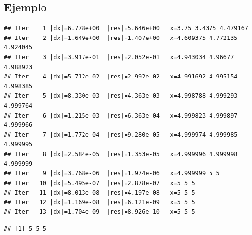 \documentclass[
]{book}
\newenvironment{Shaded}{\begin{snugshade}}{\end{snugshade}}
\newcommand{\AttributeTok}[1]{\textcolor[rgb]{0.13,0.29,0.53}{#1}}
\newcommand{\ConstantTok}[1]{\textcolor[rgb]{0.56,0.35,0.01}{#1}}
\newcommand{\DecValTok}[1]{\textcolor[rgb]{0.00,0.00,0.81}{#1}}
\newcommand{\FloatTok}[1]{\textcolor[rgb]{0.00,0.00,0.81}{#1}}
\newcommand{\FunctionTok}[1]{\textcolor[rgb]{0.13,0.29,0.53}{\textbf{#1}}}
\newcommand{\NormalTok}[1]{#1}
\newcommand{\OtherTok}[1]{\textcolor[rgb]{0.56,0.35,0.01}{#1}}
\newcommand{\SpecialCharTok}[1]{\textcolor[rgb]{0.81,0.36,0.00}{\textbf{#1}}}
\begin{document}
\subsection{Ejemplo}\label{ejemplo-10}

\begin{Shaded}
\end{Shaded}

\begin{verbatim}
## Iter    1 |dx|=6.778e+00  |res|=5.646e+00   x=3.75 3.4375 4.479167
## Iter    2 |dx|=1.649e+00  |res|=1.407e+00   x=4.609375 4.772135 4.924045
## Iter    3 |dx|=3.917e-01  |res|=2.052e-01   x=4.943034 4.96677 4.988923
## Iter    4 |dx|=5.712e-02  |res|=2.992e-02   x=4.991692 4.995154 4.998385
## Iter    5 |dx|=8.330e-03  |res|=4.363e-03   x=4.998788 4.999293 4.999764
## Iter    6 |dx|=1.215e-03  |res|=6.363e-04   x=4.999823 4.999897 4.999966
## Iter    7 |dx|=1.772e-04  |res|=9.280e-05   x=4.999974 4.999985 4.999995
## Iter    8 |dx|=2.584e-05  |res|=1.353e-05   x=4.999996 4.999998 4.999999
## Iter    9 |dx|=3.768e-06  |res|=1.974e-06   x=4.999999 5 5
## Iter   10 |dx|=5.495e-07  |res|=2.878e-07   x=5 5 5
## Iter   11 |dx|=8.013e-08  |res|=4.197e-08   x=5 5 5
## Iter   12 |dx|=1.169e-08  |res|=6.121e-09   x=5 5 5
## Iter   13 |dx|=1.704e-09  |res|=8.926e-10   x=5 5 5
\end{verbatim}

\begin{verbatim}
## [1] 5 5 5
\end{verbatim}

\backmatter
\end{document}
